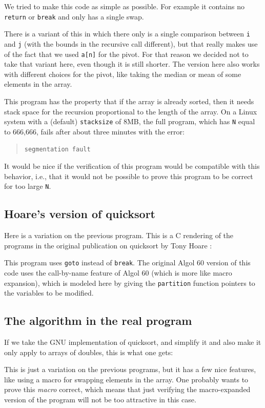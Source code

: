 \documentclass{article}
\begin{document}
We tried to make this code as simple as possible.
For example it contains no \lstinline|return| or \lstinline|break| and only has a single swap.

There is a variant of this in which there only is a single comparison between
\lstinline|i| and \lstinline|j| (with the bounds in the recursive
call different), but that really makes use of the fact
that we used \lstinline|a[n]| for the pivot.
For that reason we decided not to take that variant here, even though
it is still shorter.
The version here also works with different choices for the pivot,
like taking the median or mean of some elements in the array.

This program has the property that if the array is already sorted, then it needs stack space for the recursion proportional to the length of the array.
On a Linux system with a (default) \texttt{stacksize} of 8MB, the full program, which
has \texttt{N} equal to 666,666, fails after about three minutes with the error:
\begin{quote}
\lstinline|segmentation fault|
\end{quote}
It would be nice if the verification of this program would be compatible with this behavior, i.e., that it would not be possible to prove this program to be correct for too large \texttt{N}.

\subsection{Hoare's version of quicksort}
Here is a variation on the previous program.
This is a C rendering of the programs in the original publication on
quicksort by Tony Hoare
\cite{hoa:61}:

This program uses \lstinline{goto} instead of \lstinline{break}.
The original Algol 60 version of this code uses the call-by-name feature of Algol 60 (which is
more like macro expansion),
which is modeled here by giving the \lstinline{partition} function pointers
to the variables to be modified.

\subsection{The algorithm in the real program}
If we take the GNU implementation of quicksort, and simplify it and also make it
only apply to arrays of doubles, this is what one gets:

This is just a variation on the previous programs, but it has
a few nice features, like using a macro for swapping elements in the array.
One probably wants to prove this \emph{macro} correct,
which means that just verifying the macro-expanded version of the
program will not be too attractive in this case.
\end{document}
